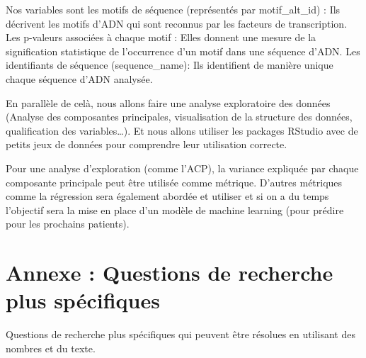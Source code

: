 \documentclass[mstat,12pt]{unswthesis}
\begin{document}
\bigskip

Nos variables sont les motifs de séquence (représentés par
motif\_alt\_id) : Ils décrivent les motifs d'ADN qui sont reconnus par
les facteurs de transcription. Les p-valeurs associées à chaque motif :
Elles donnent une mesure de la signification statistique de l'occurrence
d'un motif dans une séquence d'ADN. Les identifiants de séquence
(sequence\_name): Ils identifient de manière unique chaque séquence
d'ADN analysée.

\bigskip

En parallèle de celà, nous allons faire une analyse exploratoire des
données (Analyse des composantes principales, visualisation de la
structure des données, qualification des variables\ldots). Et nous
allons utiliser les packages RStudio avec de petits jeux de données pour
comprendre leur utilisation correcte.

\bigskip

Pour une analyse d'exploration (comme l'ACP), la variance expliquée par
chaque composante principale peut être utilisée comme métrique. D'autres
métriques comme la régression sera également abordée et utiliser et si
on a du temps l'objectif sera la mise en place d'un modèle de machine
learning (pour prédire pour les prochains patients).

\bigskip

\hypertarget{annexe-questions-de-recherche-plus-spuxe9cifiques}{%
\chapter*{Annexe : Questions de recherche plus
spécifiques}\label{annexe-questions-de-recherche-plus-spuxe9cifiques}}

Questions de recherche plus spécifiques qui peuvent être résolues en
utilisant des nombres et du texte.
\end{document}
